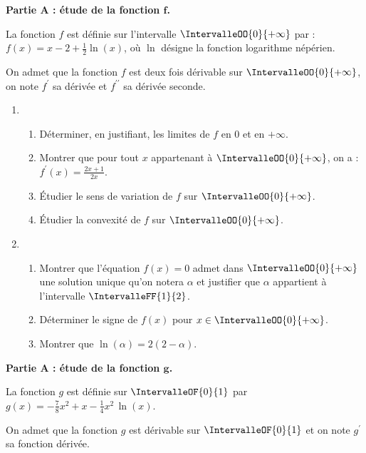 \begin{Centrage}
	\textbf{Partie A : étude de la fonction $\bm{f}$.}
\end{Centrage}

La fonction $f$ est définie sur l'intervalle $\IntervalleOO{0}{+\infty}$ par : $f(x)=x-2+\frac{1}{2} \ln(x)$, où $\ln$ désigne la fonction logarithme népérien.

On admet que la fonction $f$ est deux fois dérivable sur $\IntervalleOO{0}{+\infty}$, on note $f^{\prime}$ sa dérivée et $f^{\prime\prime}$ sa dérivée seconde.

\begin{enumerate}
	\item 
	\begin{enumerate}
		\item Déterminer, en justifiant, les limites de $f$ en $0$ et en $+\infty$.
		\item Montrer que pour tout $x$ appartenant à $\IntervalleOO{0}{+\infty}$, on a : $f^{\prime}(x)=\frac{2x+1}{2x}$.
		\item Étudier le sens de variation de $f$ sur $\IntervalleOO{0}{+\infty}$.
		\item Étudier la convexité de $f$ sur $\IntervalleOO{0}{+\infty}$.
	\end{enumerate}
	\item 
	\begin{enumerate}
		\item Montrer que l'équation $f(x)=0$ admet dans $\IntervalleOO{0}{+\infty}$ une solution unique qu'on notera $\alpha$ et justifier que $\alpha$ appartient à l'intervalle $\IntervalleFF{1}{2}$.
		\item Déterminer le signe de $f(x)$ pour $x \in \IntervalleOO{0}{+\infty}$.
		\item Montrer que $\ln (\alpha)=2(2-\alpha)$.
	\end{enumerate}
\end{enumerate}

\begin{Centrage}
	\textbf{Partie A : étude de la fonction $\bm{g}$.}
\end{Centrage}

La fonction $g$ est définie sur $\IntervalleOF{0}{1}$ par $g(x)=-\frac{7}{8}x^{2}+x-\frac{1}{4} x^{2}\,\ln(x)$.

On admet que la fonction $g$ est dérivable sur $\IntervalleOF{0}{1}$ et on note $g^{\prime}$ sa fonction dérivée.

